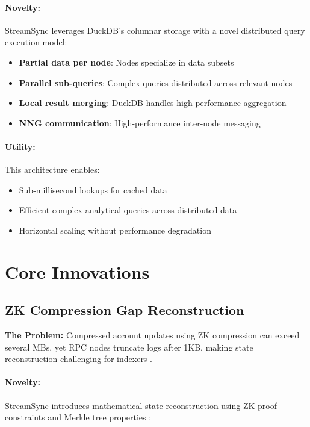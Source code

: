 \documentclass[12pt,a4paper]{article}
\begin{document}
\paragraph{Novelty:} StreamSync leverages DuckDB's columnar storage \cite{duckdb2019, columnar2005} with a novel distributed query execution model:

\begin{itemize}
    \item \textbf{Partial data per node}: Nodes specialize in data subsets
    \item \textbf{Parallel sub-queries}: Complex queries distributed across relevant nodes
    \item \textbf{Local result merging}: DuckDB handles high-performance aggregation
    \item \textbf{NNG communication}: High-performance inter-node messaging \cite{nng2018}
\end{itemize}

\paragraph{Utility:} This architecture enables:
\begin{itemize}
    \item Sub-millisecond lookups for cached data
    \item Efficient complex analytical queries across distributed data
    \item Horizontal scaling without performance degradation
\end{itemize}

\section{Core Innovations}

\subsection{ZK Compression Gap Reconstruction}

\textbf{The Problem:} Compressed account updates using ZK compression \cite{zkcompression2023} can exceed several MBs, yet RPC nodes truncate logs after 1KB, making state reconstruction challenging for indexers \cite{helius2024}.

\paragraph{Novelty:} StreamSync introduces mathematical state reconstruction using ZK proof constraints and Merkle tree properties \cite{merkle1988}:
\end{document}
